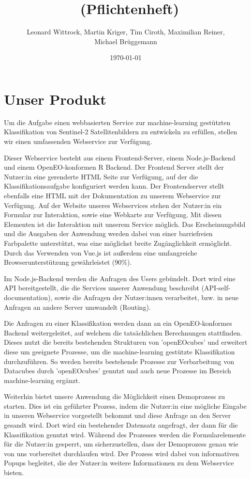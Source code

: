 \documentclass[a4paper,12pt]{article}
\title{\projektName~(Pflichtenheft)}
\author{Leonard Wittrock, Martin Kriger, Tim Ciroth, Maximilian Reiner,\\ Michael Brüggemann}
\date{\today}
\begin{document}
 \setcounter{page}{2}
 \tableofcontents          %
 \clearpage
 
\section{Unser Produkt} \label{unser produkt}
Um die Aufgabe einen webbasierten Service zur machine-learning gestützten Klassifikation von Sentinel-2 Satellitenbildern zu entwickeln zu erfüllen, stellen wir einen umfassenden Webservice zur Verfügung.
\par
Dieser Webservice besteht aus einem Frontend-Server, einem Node.js-Backend und einem OpenEO-konformen R Backend.
Der Frontend Server stellt der Nutzer:in eine gerenderte HTML Seite zur Verfügung, auf der die Klassifikationsaufgabe konfiguriert werden kann. Der Frontendserver stellt ebenfalls eine HTML mit der Dokumentation zu unserem Webservice zur Verfügung. Auf der Website unseres Webservices stehen der Nutzer:in ein Formular zur Interaktion, sowie eine Webkarte zur Verfügung. Mit diesen Elementen ist die Interaktion mit unserem Service möglich. Das Erscheinungsbild und die Ausgaben der Anwendung werden dabei von einer barriefreien Farbpalette unterstützt, was eine möglichst breite Zugänglichkeit ermöglicht. Durch das Verwenden von Vue.js ist außerdem eine umfangreiche Browserunterstützung gewährleistet (90\%). 
\par
Im Node.js-Backend werden die Anfragen des Users gebündelt. Dort wird eine API bereitgestellt, die die Services unserer Anwendung beschreibt (API-self-documentation), sowie die Anfragen der Nutzer:innen verarbeitet, bzw. in neue Anfragen an andere Server umwandelt (Routing).
\par
Die Anfragen zu einer Klassifikation werden dann an ein OpenEO-konformes Backend weitergeleitet, auf welchem die tatsächlichen Berechnungen stattfinden. Dieses nutzt die bereits bestehenden Strukturen von 'openEOcubes' und erweitert diese um geeignete Prozesse, um die machine-learning gestützte Klassifikation durchzuführen. So werden bereits bestehende Prozesse zur Verbarbeitung von Datacubes durch 'openEOcubes' genutzt und auch neue Prozesse im Bereich machine-learning ergänzt.
\par
Weiterhin bietet unsere Anwendung die Möglichkeit einen Demoprozess zu starten. Dies ist ein geführter Prozess, indem die Nutzer:in eine mögliche Eingabe in unseren Webservice vorgestellt bekommt und diese Anfrage an den Server gesandt wird. Dort wird ein bestehender Datensatz angefragt, der dann für die Klassifikation genutzt wird. Während des Prozesses werden die Formularelemente für die Nutzer:in gesperrt, um sicherzustellen, dass der Demoprozess genau wie von uns vorbereitet durchlaufen wird. Der Prozess wird dabei von informativen Popups begleitet, die der Nutzer:in weitere Informationen zu dem Webservice bieten.
\end{document}
